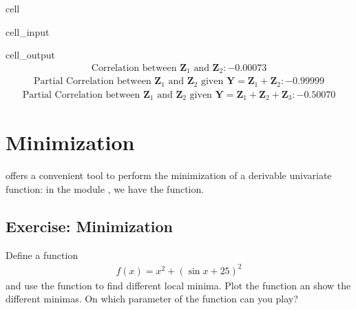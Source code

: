 \documentclass[letterpaper,10pt,english]{jupyterBook}
\begin{document}
\begin{sphinxuseclass}{cell}
\begin{sphinxVerbatimInput}
\begin{sphinxuseclass}{cell_input}
\end{sphinxuseclass}\end{sphinxVerbatimInput}
\begin{sphinxVerbatimOutput}

\begin{sphinxuseclass}{cell_output}\begin{equation*}
\begin{split}\displaystyle \text{Correlation between }\mathbf Z_1\text{ and }\mathbf Z_2: -0.00073\end{split}
\end{equation*}\begin{equation*}
\begin{split}\displaystyle \text{Partial Correlation between }\mathbf Z_1\text{ and }\mathbf Z_2\text{ given }\mathbf Y=\mathbf Z_1+\mathbf Z_2:-0.99999\end{split}
\end{equation*}\begin{equation*}
\begin{split}\displaystyle \text{Partial Correlation between }\mathbf Z_1\text{ and }\mathbf Z_2\text{ given }\mathbf Y=\mathbf Z_1+\mathbf Z_2+\mathbf Z_3:-0.50070\end{split}
\end{equation*}
\end{sphinxuseclass}\end{sphinxVerbatimOutput}

\end{sphinxuseclass}

\section{Minimization}
\label{\detokenize{01:minimization}}
\sphinxAtStartPar
{} offers a convenient tool to perform the minimization of a derivable univariate function: in the module , we have the  function.


\subsection{Exercise: Minimization}
\label{\detokenize{01:exercise-minimization}}
\sphinxAtStartPar
Define a function
\begin{equation*}
\begin{split}f(x) = x^2 + (\sin{x} + 25)^2\end{split}
\end{equation*}
\sphinxAtStartPar
and use the  function to find different local minima. Plot the function an show the different minimas. On which parameter of the  function can you play?
\end{document}
